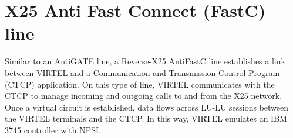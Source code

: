 \documentclass[letterpaper,10pt,english]{sphinxmanual}
\begin{document}
\newpage


\section{X25 Anti Fast Connect (FastC) line}
\label{\detokenize{connectivity_guide:index-78}}\label{\detokenize{connectivity_guide:x25-anti-fast-connect-fastc-line}}
Similar to an AntiGATE line, a Reverse-X25 AntiFastC line establishes a link between VIRTEL and a Communication and Transmission Control Program (CTCP) application. On this type of   line, VIRTEL communicates with the CTCP to manage incoming and outgoing calls to and from the X25 network. Once a virtual circuit is established, data flows across LU-LU sessions between the VIRTEL terminals and the CTCP. In this way, VIRTEL emulates an IBM 3745 controller with NPSI.


\end{document}
